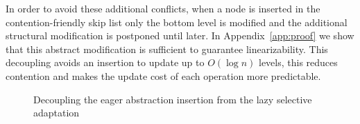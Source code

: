 In order to avoid these additional conflicts, when a node is inserted in
the contention-friendly skip list only the bottom level is modified
and the additional structural modification is postponed until later.
In Appendix~\ref{app:proof} we show that this abstract modification is sufficient to guarantee
linearizability.
This decoupling avoids an insertion to update up to $O(\log{n})$ levels, this reduces contention 
and makes the update cost of each operation more predictable.



\begin{figure}
	\begin{center}
		\hspace{3em}
	\end{center}
	\caption{Decoupling the eager abstraction insertion from the lazy selective adaptation}
\end{figure}

